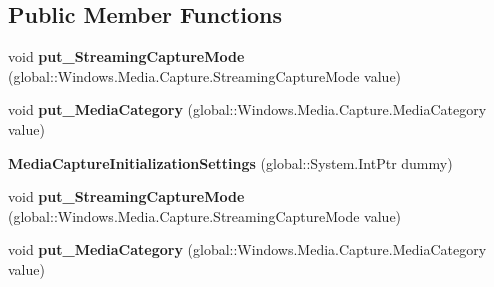 \subsection*{Public Member Functions}
\begin{DoxyCompactItemize}
\item 
\mbox{\label{class_windows_1_1_media_1_1_capture_1_1_media_capture_initialization_settings_a1fe5c8f5b538af9f1d18229efda3e968}} 
void {\bfseries put\+\_\+\+Streaming\+Capture\+Mode} (global\+::\+Windows.\+Media.\+Capture.\+Streaming\+Capture\+Mode value)
\item 
\mbox{\label{class_windows_1_1_media_1_1_capture_1_1_media_capture_initialization_settings_a9ec43e909f9030339cf2eb4f47c0e14f}} 
void {\bfseries put\+\_\+\+Media\+Category} (global\+::\+Windows.\+Media.\+Capture.\+Media\+Category value)
\item 
\mbox{\label{class_windows_1_1_media_1_1_capture_1_1_media_capture_initialization_settings_ac7187e1a40d8f32e90a7585f37dec31c}} 
{\bfseries Media\+Capture\+Initialization\+Settings} (global\+::\+System.\+Int\+Ptr dummy)
\item 
\mbox{\label{class_windows_1_1_media_1_1_capture_1_1_media_capture_initialization_settings_a1fe5c8f5b538af9f1d18229efda3e968}} 
void {\bfseries put\+\_\+\+Streaming\+Capture\+Mode} (global\+::\+Windows.\+Media.\+Capture.\+Streaming\+Capture\+Mode value)
\item 
\mbox{\label{class_windows_1_1_media_1_1_capture_1_1_media_capture_initialization_settings_a9ec43e909f9030339cf2eb4f47c0e14f}} 
void {\bfseries put\+\_\+\+Media\+Category} (global\+::\+Windows.\+Media.\+Capture.\+Media\+Category value)
\item 
\mbox{\label{class_windows_1_1_media_1_1_capture_1_1_media_capture_initialization_settings_ac7187e1a40d8f32e90a7585f37dec31c}} 

\end{DoxyCompactItemize}
